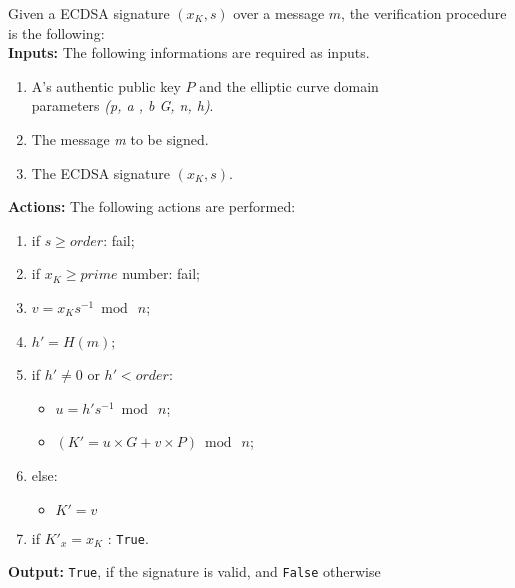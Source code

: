 Given a ECDSA signature $(x_{K},s)$ over a message $m$, the verification procedure is the following: \\
\textbf{Inputs:} The following informations are required as inputs. 

\hspace{1.1cm}
\begin{minipage}[l]{2\linewidth}
	\begin{enumerate}
		\item A's authentic public key  \textit{$P$} and the elliptic curve domain \\parameters \textit{(p, a , b G, n, h)}.
		\item The message \textit{m} to be signed.
		\item The ECDSA signature $(x_{K},s)$.\\
	\end{enumerate}
\end{minipage}
\textbf{Actions:} The following actions are performed:

\hspace{1.1cm}
\begin{minipage}[l]{2\linewidth}
	\begin{enumerate}
		\item if $s\geq order$: fail;
		\item if $x_{K} \geq prime$ number: fail;
		\item $v=x_{K}s^{-1} \bmod\ n$;
		\item $h'= H(m)$;
		\item if $h'\neq 0$ or $h'<order$:
		\begin{itemize}
			\item $u=h' s^{-1} \bmod\ n$;
			\item $(K'=u\times G + v\times P) \bmod\ n$;
		\end{itemize}
		\item else:
		\begin{itemize}
			\item $K'=v$
		\end{itemize}
		\item if $K'_{x} = x_{K}$ : \texttt{True}.\\
	\end{enumerate}
\end{minipage}
\textbf{Output:} \texttt{True}, if the signature is valid, and \texttt{False} otherwise


